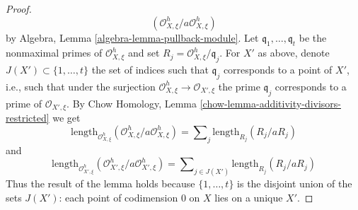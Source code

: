\documentclass[10pt,a4paper]{amsart}
\theoremstyle{plain}
\theoremstyle{definition}
\theoremstyle{remark}
\numberwithin{equation}{subsection}
\begin{document}
\begin{proof}
$$(\mathcal{O}_{X, \xi}^h/a \mathcal{O}_{X, \xi}^h)
$$
by Algebra, Lemma \ref{algebra-lemma-pullback-module}.
Let $\mathfrak q_1, \ldots, \mathfrak q_t$ be the nonmaximal
primes of $\mathcal{O}_{X, \xi}^h$ and set
$R_j = \mathcal{O}_{X, \xi}^h/\mathfrak q_j$.
For $X'$ as above, denote $J(X') \subset \{1, \ldots, t\}$
the set of indices such that $\mathfrak q_j$ corresponds
to a point of $X'$, i.e., such that under the surjection
$\mathcal{O}_{X, \xi}^h \to \mathcal{O}_{X', \xi}$
the prime $\mathfrak q_j$ corresponds to a prime
of $\mathcal{O}_{X', \xi}$.
By Chow Homology, Lemma \ref{chow-lemma-additivity-divisors-restricted}
we get
$$
\text{length}_{\mathcal{O}_{X, \xi}^h}
(\mathcal{O}_{X, \xi}^h/a \mathcal{O}_{X, \xi}^h) =
\sum\nolimits_j \text{length}_{R_j}(R_j/a R_j)
$$
and
$$
\text{length}_{\mathcal{O}_{X', \xi}^h}
(\mathcal{O}_{X', \xi}^h/a \mathcal{O}_{X', \xi}^h) =
\sum\nolimits_{j \in J(X')} \text{length}_{R_j}(R_j/a R_j)
$$
Thus the result of the lemma holds because
$\{1, \ldots, t\}$ is the disjoint union of the sets $J(X')$:
each point of codimension $0$ on $X$ lies on a unique $X'$.
\end{proof}
\end{document}
